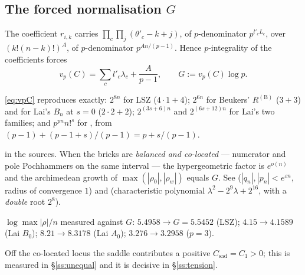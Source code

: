 \subsection{The forced normalisation \texorpdfstring{$G$}{G}}\label{ss:G}

\begin{proposition}\label{prop:G}
\DERIVED{} The coefficient $r_{i,k}$ carries $\prod_c\prod_j(\theta'_c-k+j)$, of $p$-denominator
$p^{l'_cL_c}$, over $(k!(n-k)!)^A$, of $p$-denominator $p^{An/(p-1)}$. Hence
$p$-integrality of the coefficients forces
\begin{equation}\label{eq:vpC}
 v_p(C)=\sum_c l'_c\lambda_c+\frac{A}{p-1},\qquad G:=v_p(C)\log p .
\end{equation}
\end{proposition}

\begin{finding}\label{find:Ganchors}
 \eqref{eq:vpC} reproduces exactly: $2^{8n}$ for LSZ
($4\cdot1+4$); $2^{6n}$ for Beukers' $R^{(\mathrm B)}$ ($3+3$) and for Lai's $B_n$ at $s=0$
($2\cdot2+2$); $2^{(3s+6)n}$ and $2^{(6s+12)n}$ for Lai's two families; and
$p^{pn}n!^{s}$ for \cite{LLS2025}, from
$(p-1)+(p-1+s)/(p-1)=p+s/(p-1)$.
\end{finding}

\begin{proposition}\label{prop:Gisgrowth}
\PROVED{} in the sources. When the bricks are \emph{balanced and co-located} --- numerator
and pole Pochhammers on the same interval --- the hypergeometric factor is $e^{o(n)}$ and
the archimedean growth of $\max(|\rho_0|,|\rho_w|)$ equals $G$. See
\cite[Prop.~11.1(3)]{Beukers2008} ($|q_n|,|p_n|<e^{\varepsilon n}$, radius of convergence
$1$) and \cite[Lemma 20]{LSZ2025} (characteristic polynomial $\lambda^2-2^9\lambda+2^{16}$,
with a \emph{double} root $2^8$).
\end{proposition}

\begin{finding}\label{find:Gmeasured}
 $\log\max|\rho|/n$ measured against $G$:
$5.4958\to G=5.5452$ (LSZ); $4.15\to4.1589$ (Lai $B_0$); $8.21\to8.3178$ (Lai $A_0$);
$3.276\to3.2958$ ($p=3$).
\end{finding}

Off the co-located locus the saddle contributes a positive $C_{\mathrm{sad}}=C_1>0$; this is
measured in \S\ref{ss:unequal} and it is decisive in \S\ref{ss:tension}.

